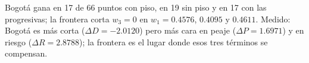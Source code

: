 {Bogotá gana en 17 de 66 puntos con piso, en 19 sin piso y en 17 con las progresivas; la frontera corta $w_3=0$ en $w_1 = 0.4576$, $0.4095$ y $0.4611$.}
{Medido: Bogotá es más corta ($\Delta D = -2.0120$) pero más cara en peaje ($\Delta P = 1.6971$) y en riesgo ($\Delta R = 2.8788$); la frontera es el lugar donde esos tres términos se compensan.}
